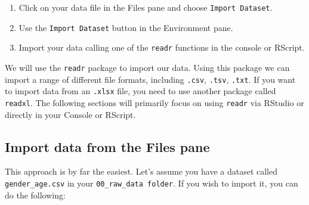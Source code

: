\documentclass[
]{book}
\begin{document}
\begin{enumerate}
\def\labelenumi{\arabic{enumi}.}
\item
  Click on your data file in the Files pane and choose \texttt{Import\ Dataset}.
\item
  Use the \texttt{Import\ Dataset} button in the Environment pane.
\item
  Import your data calling one of the \texttt{readr} functions in the console or RScript.
\end{enumerate}

We will use the \texttt{readr} package to import our data. Using this package we can import a range of different file formats, including \texttt{.csv}, \texttt{.tsv}, \texttt{.txt}. If you want to import data from an \texttt{.xlsx} file, you need to use another package called \texttt{readxl}. The following sections will primarily focus on using \texttt{readr} via RStudio or directly in your Console or RScript.

\hypertarget{import-data-from-the-files-pane}{%
\subsection{Import data from the Files pane}\label{import-data-from-the-files-pane}}

This approach is by far the easiest. Let's assume you have a dataset called \texttt{gender\_age.csv} in your \texttt{00\_raw\_data\ folder}. If you wish to import it, you can do the following:
\end{document}

